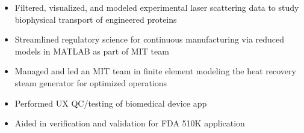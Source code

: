 \documentclass[10.95pt,letterpaper]{altacv}
\newlength{\comlogowidth}
\newcommand{\companylogo}[1]{%
	\savebox{\comlogobox}{\texttt{[image: \#1]}}%
	\settowidth{\comlogowidth}{\usebox{\comlogobox}}
}
\newcommand{\makelogospace}{\hspace*{\comlogowidth}\enspace}
\newcommand{\usecompanylogo}{\raisebox{0pt}[1em]{\usebox{\comlogobox}}\enspace}
\begin{document}
	\begin{itemize}
		\item Filtered, visualized, and modeled experimental laser scattering data to study biophysical transport of engineered proteins
	\end{itemize}	
	\divider
	
	\begin{itemize}
		\item Streamlined regulatory science for continuous manufacturing via reduced
		models in MATLAB as part of MIT team
	\end{itemize}
	\divider
	
	\begin{itemize}
	\item Managed and led an MIT team in finite element modeling the heat recovery steam generator for optimized operations
	\end{itemize}
	\divider
	
	\begin{itemize}
	\item Performed UX QC/testing of biomedical device app
	\item Aided in verification and validation for FDA 510K application
	\end{itemize}
	\divider
	
 
\end{document}
